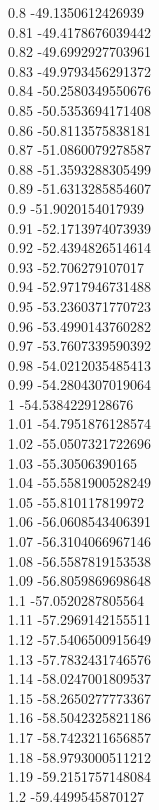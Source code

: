 {0.8	-49.1350612426939\\
0.81	-49.4178676039442\\
0.82	-49.6992927703961\\
0.83	-49.9793456291372\\
0.84	-50.2580349550676\\
0.85	-50.5353694171408\\
0.86	-50.8113575838181\\
0.87	-51.0860079278587\\
0.88	-51.3593288305499\\
0.89	-51.6313285854607\\
0.9	-51.9020154017939\\
0.91	-52.1713974073939\\
0.92	-52.4394826514614\\
0.93	-52.706279107017\\
0.94	-52.9717946731488\\
0.95	-53.2360371770723\\
0.96	-53.4990143760282\\
0.97	-53.7607339590392\\
0.98	-54.0212035485413\\
0.99	-54.2804307019064\\
1	-54.5384229128676\\
1.01	-54.7951876128574\\
1.02	-55.0507321722696\\
1.03	-55.30506390165\\
1.04	-55.5581900528249\\
1.05	-55.810117819972\\
1.06	-56.0608543406391\\
1.07	-56.3104066967146\\
1.08	-56.5587819153538\\
1.09	-56.8059869698648\\
1.1	-57.0520287805564\\
1.11	-57.2969142155511\\
1.12	-57.5406500915649\\
1.13	-57.7832431746576\\
1.14	-58.0247001809537\\
1.15	-58.2650277773367\\
1.16	-58.5042325821186\\
1.17	-58.7423211656857\\
1.18	-58.9793000511212\\
1.19	-59.2151757148084\\
1.2	-59.4499545870127\\
}
